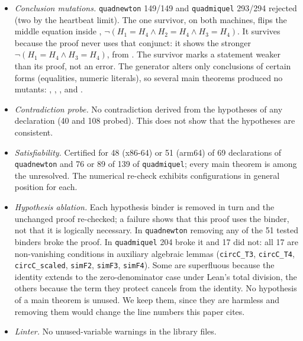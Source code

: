 \documentclass[11pt]{article}
\theoremstyle{definition}
\theoremstyle{remark}
\newcommand{\lean}[1]{\texttt{#1}}
\begin{document}
\begin{itemize}
\item \emph{Conclusion mutations.} \lean{quadnewton} 149/149 and \lean{quadmiquel} 293/294 rejected (two
by the heartbeat limit). The one survivor, on both machines, flips the middle equation inside
, $\neg(H_1=H_4\wedge H_2=H_4\wedge H_3=H_4)$. It survives
because the proof never uses that conjunct: it shows the stronger $\neg(H_1=H_4\wedge H_3=H_4)$, from
. The survivor marks a statement weaker than its proof, not an
error. The generator alters only conclusions of certain forms
(equalities, numeric literals), so several main theorems produced no mutants:
, , ,
 and .
\item \emph{Contradiction probe.} No contradiction derived from the hypotheses of any declaration (40 and
108 probed). This does not show that the hypotheses are consistent.
\item \emph{Satisfiability.} Certified for 48 (x86-64) or 51 (arm64) of 69 declarations of
\lean{quadnewton} and 76 or 89 of 139 of \lean{quadmiquel}; every main theorem is among the unresolved.
The numerical re-check exhibits configurations in general position for each.
\item \emph{Hypothesis ablation.} Each hypothesis binder is removed in turn and the unchanged proof
re-checked; a failure shows that this proof uses the binder, not that it is logically necessary. In
\lean{quadnewton} removing any of the 51 tested binders broke the proof. In \lean{quadmiquel} 204 broke
it and 17 did not: all 17 are non-vanishing conditions in auxiliary algebraic lemmas
(\lean{circC\_T3}, \lean{circC\_T4}, \lean{circC\_scaled}, \lean{simF2}, \lean{simF3}, \lean{simF4}).
Some are superfluous because the identity extends to the zero-denominator case under Lean's total
division, the others because the term they protect cancels from the identity. No hypothesis of a main
theorem is unused. We keep them, since they are harmless and removing them would change the line
numbers this paper cites.
\item \emph{Linter.} No unused-variable warnings in the library files.
\end{itemize}
\end{document}
